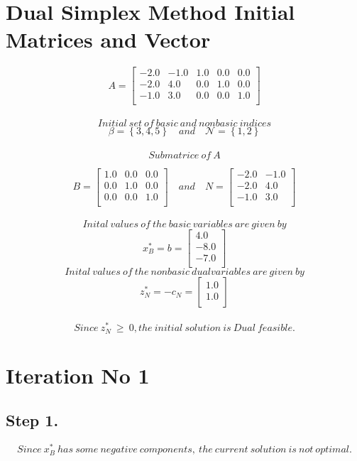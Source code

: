 \documentclass [12pt] {article}
\begin{document}
\section*{Dual Simplex Method Initial Matrices and Vector} 
\[
A  =
\begin{bmatrix}
-2.0 & -1.0 & 1.0 & 0.0 & 0.0 \\ -2.0 & 4.0 & 0.0 & 1.0 & 0.0 \\ -1.0 & 3.0 & 0.0 & 0.0 & 1.0 \\ 
\end{bmatrix}
\]
\\
\[ Initial\ set\  of\  basic\  and\  nonbasic\  indices \]
\[
\beta= \left\{3, 4, 5\right\} \quad and \quad  \mathcal{N}=\left\{1, 2\right\}
\]
\\
\[
Submatrice\ of \ A
\]

\[
B =
\begin{bmatrix}
1.0 & 0.0 & 0.0 \\ 0.0 & 1.0 & 0.0 \\ 0.0 & 0.0 & 1.0 \\ 
\end{bmatrix} \quad and \quad
\mathit{N} =
\begin{bmatrix}
-2.0 & -1.0 \\ -2.0 & 4.0 \\ -1.0 & 3.0 \\ 
\end{bmatrix}
\]
\\
\[
Inital\ values\ of\ the\ basic\ variables\ are\ given\ by
\]
\[
x_B^* = b =
\begin{bmatrix}
4.0 \\ -8.0 \\ -7.0 \\ 
\end{bmatrix}
\]
\[
Inital\ values\ of\ the\ nonbasic\ dual variables\ are\ given\ by
\]
\[
z_\mathit{N}^*= -c_\mathit{N} =
\begin{bmatrix}
1.0 \\ 1.0 \\ 
\end{bmatrix}
\]
\\
\[
Since\ z_N^*\  \geq \  0, the\ initial\ solution\ is\ Dual\ feasible.
\]
\section*{Iteration No 1}
\subsection{Step 1.}
\[
Since\ x_\mathit{B}^*\ has\ some\ negative\ components,\ the\ current\ solution\ is\ not\ optimal.
\]
\end{document}
